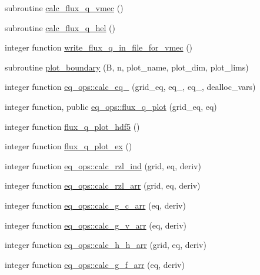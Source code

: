 \begin{DoxyCompactItemize}
\item 
subroutine \hyperlink{eq__ops_8f90_a886bd144f9e11efb18f34b5d1f06e5c5}{calc\+\_\+flux\+\_\+q\+\_\+vmec} ()
\item 
subroutine \hyperlink{eq__ops_8f90_a6513c2a78e561f6349e4524f6933e283}{calc\+\_\+flux\+\_\+q\+\_\+hel} ()
\item 
integer function \hyperlink{eq__ops_8f90_aecc1d4103aa82217d3014ebb09d7f1e5}{write\+\_\+flux\+\_\+q\+\_\+in\+\_\+file\+\_\+for\+\_\+vmec} ()
\item 
subroutine \hyperlink{eq__ops_8f90_a627b6dce4cc49504cdcb156e0179f24d}{plot\+\_\+boundary} (B, n, plot\+\_\+name, plot\+\_\+dim, plot\+\_\+lims)
\item 
integer function \hyperlink{namespaceeq__ops_a91256e08dadab2ccbabd66cf369c43a5}{eq\+\_\+ops\+::calc\+\_\+eq\+\_} (grid\+\_\+eq, eq\+\_, eq\+\_, dealloc\+\_\+vars)
\item 
integer function, public \hyperlink{namespaceeq__ops_af0effe20188d46a44680c2648e4572e9}{eq\+\_\+ops\+::flux\+\_\+q\+\_\+plot} (grid\+\_\+eq, eq)
\item 
integer function \hyperlink{eq__ops_8f90_aed8d3363343555190699b29e393b4e23}{flux\+\_\+q\+\_\+plot\+\_\+hdf5} ()
\item 
integer function \hyperlink{eq__ops_8f90_aef1c3c58c42be2651bc2153d0a1ae5a9}{flux\+\_\+q\+\_\+plot\+\_\+ex} ()
\item 
integer function \hyperlink{namespaceeq__ops_a42524ab0697a7a986e2f86c4c75cdc33}{eq\+\_\+ops\+::calc\+\_\+rzl\+\_\+ind} (grid, eq, deriv)
\item 
integer function \hyperlink{namespaceeq__ops_a366f4cef2390a357f73e73ca56a57497}{eq\+\_\+ops\+::calc\+\_\+rzl\+\_\+arr} (grid, eq, deriv)
\item 
integer function \hyperlink{namespaceeq__ops_a7f4a16387d43c37a1dfa78eb4f91d4e4}{eq\+\_\+ops\+::calc\+\_\+g\+\_\+c\+\_\+arr} (eq, deriv)
\item 
integer function \hyperlink{namespaceeq__ops_acf8e40b36693a2c3cc778a85ef66bc32}{eq\+\_\+ops\+::calc\+\_\+g\+\_\+v\+\_\+arr} (eq, deriv)
\item 
integer function \hyperlink{namespaceeq__ops_a2874986e80f079d585725b46a327b9e8}{eq\+\_\+ops\+::calc\+\_\+h\+\_\+h\+\_\+arr} (grid, eq, deriv)
\item 
integer function \hyperlink{namespaceeq__ops_a29e2bd79210505601bdb37566a503e2a}{eq\+\_\+ops\+::calc\+\_\+g\+\_\+f\+\_\+arr} (eq, deriv)
\item 

\end{DoxyCompactItemize}
